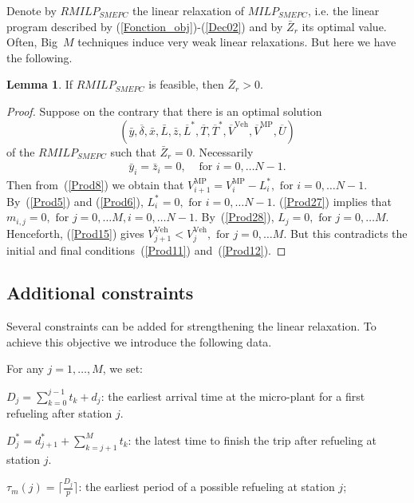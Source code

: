 \documentclass[11pt]{article}
\theoremstyle{plain}%
\theoremstyle{definition} \newtheorem{lem}{Lemma}[section]
\theoremstyle{definition} \newtheorem{claim}{Claim}[lem]
\theoremstyle{definition} \newtheorem{theorem}{Theorem}[section]
\theoremstyle{definition} \newtheorem{exo}{Exercice n$^\circ$}
\theoremstyle{definition} \newtheorem{quest}{}[exo]
\theoremstyle{definition} \newtheorem{sousquest}{}[quest]
\theoremstyle{remark}
\theoremstyle{definition}
\begin{document}
Denote by $RMILP_{SMEPC}$ the linear relaxation of $MILP_{SMEPC}$, i.e. the linear program described by (\ref{Fonction_obj})-(\ref{Dec02})
and by $\bar{Z}_{r}$ its optimal value.
Often, Big~$M$ techniques induce very weak linear relaxations. But here we have the following.

\begin{lem}
If $RMILP_{SMEPC}$ is feasible, then $\bar{Z}_{r} > 0$.
\end{lem}
\begin{proof}
Suppose on the contrary that there is an optimal solution
 $$(\bar{y},\overline{\delta},\bar{x},\bar{L},\bar{z},\overline{L}^*,\overline{T},\overline{T}^*, \overline{V}^{\textrm{Veh}},\overline{V}^{\textrm{MP}},\overline{U})$$
of the $RMILP_{SMEPC}$ such that $\bar{Z}_{r} = 0$.
Necessarily 
\begin{eqnarray*}	
\bar{y}_i = \bar{z}_i = 0,  & \textrm{ for  } i=0, \ldots N-1.
\end{eqnarray*}
Then from~(\ref{Prod8}) we obtain that $V^{\textrm{MP}}_{i+1}= V^{\textrm{MP}}_{i} -  L^*_i,  \textrm{ for }  i = 0, \ldots N-1	$.
By~(\ref{Prod5}) and (\ref{Prod6}), $  L^*_i =0,  \textrm{ for }  i = 0, \ldots N-1$.
(\ref{Prod27})  implies that  $ m_{i,j} =0 ,   \textrm{ for } j=0, \ldots   M,  i= 0, \ldots N-1$.
 By~(\ref{Prod28}),  $L_j = 0,   \textrm{ for }  j= 0, \ldots M $.
Henceforth, (\ref{Prod15}) gives 
$V_{j+1}^{\textrm{Veh}} < V_{j}^{\textrm{Veh}}, \textrm{ for  } j = 0, \ldots M $.
But this contradicts the initial and final conditions~(\ref{Prod11}) and~(\ref{Prod12}).                   
\end{proof}
%
\subsection{Additional constraints}
Several constraints can be added for strengthening the linear relaxation. 
To achieve this objective we introduce the following data.

For any $j =1, \dots, M$, we set:

$D_j=\sum_{k=0}^{j-1} t_k+d_j$: the earliest arrival time at the micro-plant for a first refueling after  station $j$.

 $D^*_j= d^*_{j+1} +\sum_{k={j+1}}^{M} t_k$: the latest time to finish the trip after refueling at station $j$.

$\tau_m(j) =\lceil \frac{D_j}{p} \rceil$: the earliest period of  a possible refueling at  station $j$;
\end{document}
